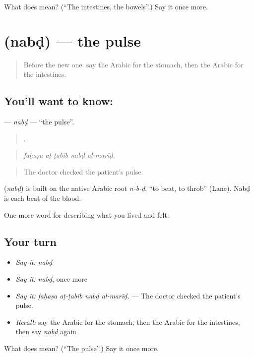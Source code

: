 \begin{tcolorbox}[breakable,colback=teal!4,colframe=teal!35!black,title={Before you move on}]
What does  mean? (\textquotedblleft{}The intestines, the bowels\textquotedblright{}.) Say it once more.
\end{tcolorbox}
\section[\texorpdfstring{\ar{نبض} (nabḍ)}{نبض (nabḍ)}]{ (nabḍ) — the pulse}

\label{lesson:AR-C504-nabd}



\begin{quote}
Before the new one: say the Arabic for the stomach, then the Arabic for the intestines.
\end{quote}

\subsection*{You'll want to know: }
\textbf{} — \emph{nabḍ} — \textquotedblleft{}the pulse\textquotedblright{}.

\begin{quote}
   .
\end{quote}

\begin{quote}
\emph{faḥaṣa aṭ-ṭabīb nabḍ al-marīḍ.}
\end{quote}

\begin{quote}
The doctor checked the patient's pulse.
\end{quote}

\begin{cousinweb}
\textbf{} (\emph{nabḍ}) is built on the native Arabic root \emph{n-b-ḍ}, \textquotedblleft{}to beat, to throb\textquotedblright{} (Lane). Nabḍ is each beat of the blood.
\end{cousinweb}

\begin{grammarlens}[title={What you've built}]
One more word for describing what you lived and felt.
\end{grammarlens}

\subsection*{Your turn}
\begin{itemize}
\raggedright
  \item \emph{Say it:} \emph{nabḍ}
  \item \emph{Say it:} \emph{nabḍ}, once more
  \item \emph{Say it:} \emph{faḥaṣa aṭ-ṭabīb nabḍ al-marīḍ.} — The doctor checked the patient's pulse.
  \item \emph{Recall:} say the Arabic for the stomach, then the Arabic for the intestines, then say \emph{nabḍ} again
\end{itemize}

\begin{tcolorbox}[breakable,colback=teal!4,colframe=teal!35!black,title={Before you move on}]
What does  mean? (\textquotedblleft{}The pulse\textquotedblright{}.) Say it once more.
\end{tcolorbox}
